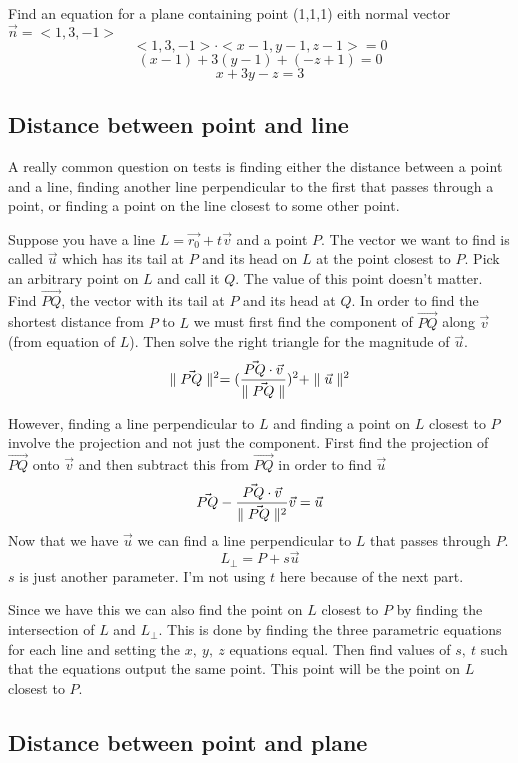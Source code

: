 \documentclass[12 pt]{article}
\begin{document}
		\begin{exmp*}
			Find an equation for a plane containing point (1,1,1) eith normal vector $\vec{n}=<1,3,-1>$
			$$<1,3,-1>\cdot<x-1,y-1,z-1>=0$$
			$$(x-1)+3(y-1)+(-z+1)=0$$
			$$x+3y-z=3$$
		\end{exmp*}

		\subsection{Distance between point and line}

		A really common question on tests is finding either the distance between a point and a line, finding another line perpendicular to the first that passes through a point, or finding a point on the line closest to some other point.

		Suppose you have a line $L=\vec{r_0}+t\vec{v}$ and a point $P$. The vector we want to find is called $\vec{u}$ which has its tail at $P$ and its head on $L$ at the point closest to $P$. Pick an arbitrary point on $L$ and call it $Q$. The value of this point doesn't matter. Find $\vec{PQ}$, the vector with its tail at $P$ and its head at $Q$. In order to find the shortest distance from $P$ to $L$ we must first find the component of $\vec{PQ}$ along $\vec{v}$ (from equation of $L$). Then solve the right triangle for the magnitude of $\vec{u}$.
		$$\parallel \vec{PQ} \parallel^2= (\frac{\vec{PQ}\cdot\vec{v}}{\parallel \vec{PQ} \parallel})^2+\parallel \vec{u} \parallel^2$$

		However, finding a line perpendicular to $L$ and finding a point on $L$ closest to $P$ involve the projection and not just the component. First find the projection of $\vec{PQ}$ onto $\vec{v}$ and then subtract this from $\vec{PQ}$ in order to find $\vec{u}$
		$$\vec{PQ}-\frac{\vec{PQ}\cdot\vec{v}}{\parallel \vec{PQ} \parallel^2}\vec{v}=\vec{u}$$
		Now that we have $\vec{u}$ we can find a line perpendicular to $L$ that passes through $P$.
		$$L_\perp=P+s\vec{u}$$
		$s$ is just another parameter. I'm not using $t$ here because of the next part.

		Since we have this we can also find the point on $L$ closest to $P$ by finding the intersection of $L$ and $L_\perp$. This is done by finding the three parametric equations for each line and setting the $x,\ y,\ z$ equations equal. Then find values of $s,\ t$ such that the equations output the same point. This point will be the point on $L$ closest to $P$.

		\subsection{Distance between point and plane}
\end{document}
